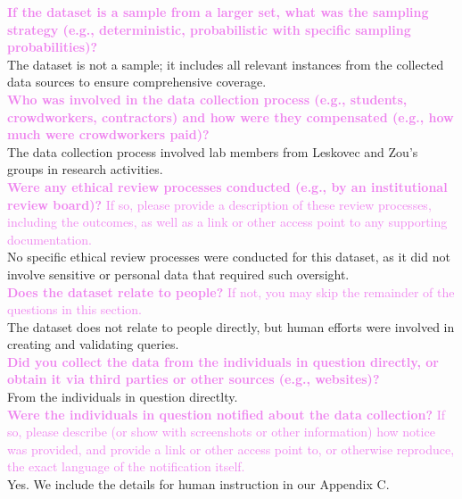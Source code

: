 \documentclass{article}
\newcommand{\sectioncolor}{Violet}
\begin{document}
    \textcolor{\sectioncolor}{\textbf{
    If the dataset is a sample from a larger set, what was the sampling
    strategy (e.g., deterministic, probabilistic with specific sampling
    probabilities)?
    }
    } \\
    The dataset is not a sample; it includes all relevant instances from the collected data sources to ensure comprehensive coverage.\\
    
    \textcolor{\sectioncolor}{\textbf{
    Who was involved in the data collection process (e.g., students,
    crowdworkers, contractors) and how were they compensated (e.g., how much
    were crowdworkers paid)?
    }
    } \\
    The data collection process involved lab members from Leskovec and Zou's groups in  research activities.\\
    
    \textcolor{\sectioncolor}{\textbf{
    Were any ethical review processes conducted (e.g., by an institutional
    review board)?
    }
    If so, please provide a description of these review processes, including
    the outcomes, as well as a link or other access point to any supporting
    documentation.
    } \\
    No specific ethical review processes were conducted for this dataset, as it did not involve sensitive or personal data that required such oversight.\\
    
    \textcolor{\sectioncolor}{\textbf{
    Does the dataset relate to people?
    }
    If not, you may skip the remainder of the questions in this section.
    } \\
    The dataset does not relate to people directly, but human efforts were involved in creating and validating queries.\\
    
    \textcolor{\sectioncolor}{\textbf{
    Did you collect the data from the individuals in question directly, or
    obtain it via third parties or other sources (e.g., websites)?
    }
    } \\
    From the individuals in question directlty.\\
    
    \textcolor{\sectioncolor}{\textbf{
    Were the individuals in question notified about the data collection?
    }
    If so, please describe (or show with screenshots or other information) how
    notice was provided, and provide a link or other access point to, or
    otherwise reproduce, the exact language of the notification itself.
    } \\
    Yes. We include the details for human instruction in our Appendix C.\\
    
\end{document}

